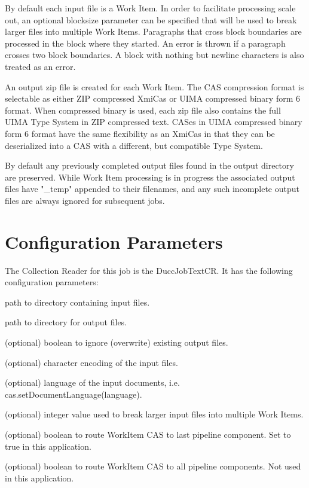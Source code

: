 By default each input file is a Work Item. In order to facilitate processing scale out, 
an optional blocksize parameter can be specified that will be used to break larger 
files into multiple Work Items. Paragraphs that cross block boundaries are processed
in the block where they started. An error is thrown if a paragraph crosses two block
boundaries. A block with nothing but newline characters is also treated as an error.

An output zip file is created for each Work Item. The CAS compression format is selectable as
either ZIP compressed XmiCas or UIMA compressed binary form 6 format. When compressed binary
is used, each zip file also contains the full UIMA Type System in ZIP compressed text.
CASes in UIMA compressed binary form 6 format have the same flexibility as an XmiCas in that
they can be deserialized into a CAS with a different, but compatible Type System.

By default any previously completed output files found in the output directory are preserved.
While Work Item processing is in progress the associated output files have "\_temp" appended to their
filenames, and any such incomplete output files are always ignored for subsequent jobs.

\section{Configuration Parameters}
The Collection Reader for this job is the DuccJobTextCR. It has the following configuration
parameters:

\begin{description}[labelindent=0.5in,leftmargin=0.5in]
    \item[InputDirectory] path to directory containing input files.
    \item[OutputDirectory] path to directory for output files.
    \item[IgnorePreviousOutput] (optional) boolean to ignore (overwrite) existing output files.
    \item[Encoding] (optional) character encoding of the input files.
    \item[Language] (optional) language of the input documents, i.e. cas.setDocumentLanguage(language).
    \item[BlockSize] (optional) integer value used to break larger input files into multiple Work Items.
    \item[SendToLast] (optional) boolean to route WorkItem CAS to last pipeline component. Set to true in this application.
    \item[SendToAll] (optional) boolean to route WorkItem CAS to all pipeline components. Not used in this application.
\end{description}

